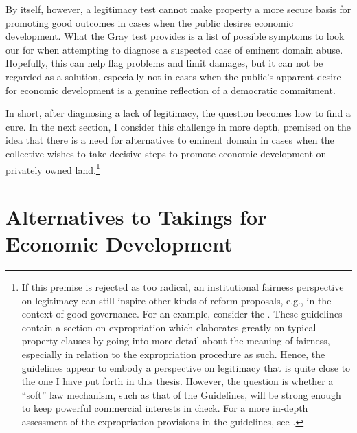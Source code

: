 By itself, however, a legitimacy test cannot make property a more secure basis for promoting good outcomes in cases when the public desires economic development. What the Gray test provides is a list of possible symptoms to look our for when attempting to diagnose a suspected case of eminent domain abuse. Hopefully, this can help flag problems and limit damages, but it can not be regarded as a solution, especially not in cases when the public's apparent desire for economic development is a genuine reflection of a democratic commitment. 

In short, after diagnosing a lack of legitimacy, the question becomes how to find a cure. In the next section, I consider this challenge in more depth, premised on the idea that there is a need for alternatives to eminent domain in cases when the collective wishes to take decisive steps to promote economic development on privately owned land.\footnote{If this premise is rejected as too radical, an institutional fairness perspective on legitimacy can still inspire other kinds of reform proposals, e.g., in the context of good governance. For an example, consider the \cite{guide12}. These guidelines contain a section on expropriation which elaborates greatly on typical property clauses by going into more detail about the meaning of fairness, especially in relation to the expropriation procedure as such. Hence, the guidelines appear to embody a perspective on legitimacy that is quite close to the one I have put forth in this thesis. However, the question is whether a ``soft'' law mechanism, such as that of the Guidelines, will be strong enough to keep powerful commercial interests in check. For a more in-depth assessment of the expropriation provisions in the guidelines, see \cite{hoops15}.}

\section{Alternatives to Takings for Economic Development}\label{sec:3:6}

